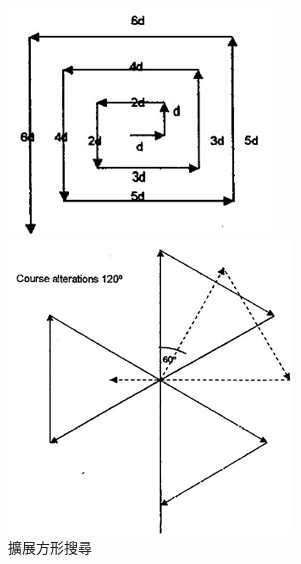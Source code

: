 \documentclass[12pt,a4paper]{article}
\begin{document}
\begin{figure}[h]
    \centering
    \begin{minipage}[t]{0.3\textwidth}
        \centering
        \includegraphics[width=\textwidth]{image/ExpandingSquareSearch.png}
        \caption{擴展方形搜尋}
    \end{minipage}%
    \hfill
    \begin{minipage}[t]{0.3\textwidth}
        \centering
        \includegraphics[width=\textwidth]{image/SectorSearch.png}

\end{minipage}
\end{figure}
\end{document}
